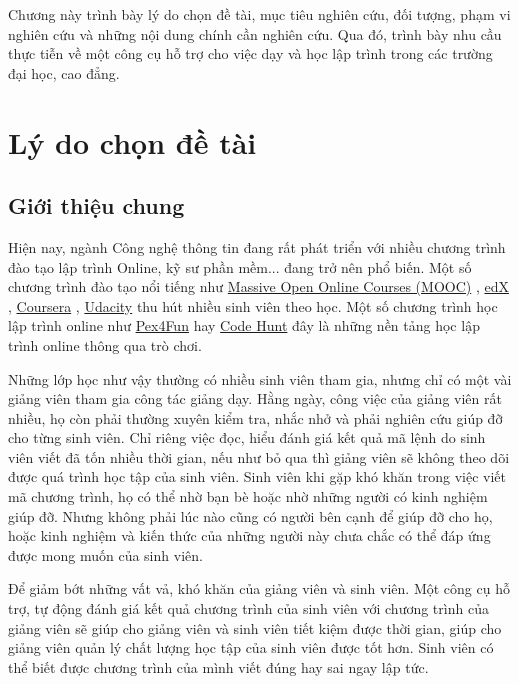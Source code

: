 
Chương này trình bày lý do chọn đề tài, mục tiêu nghiên cứu, đối tượng, phạm vi nghiên cứu và những nội dung chính cần nghiên cứu. Qua đó, trình bày nhu cầu thực tiễn về một công cụ hỗ trợ cho việc dạy và học lập trình trong các trường đại học, cao đẳng.

\section{Lý do chọn đề tài}

\subsection{Giới thiệu chung}

Hiện nay, ngành Công nghệ thông tin đang rất phát triển với nhiều chương trình đào tạo lập trình Online, kỹ sư phần mềm... đang trở nên phổ biến. Một số chương trình đào tạo nổi tiếng như \href{https://www.coursera.org/course/saas}{Massive Open Online Courses (MOOC)} \cite{mooc}, \href{https://www.edx.org/}{edX} \cite{edx}, \href{https://www.coursera.org/}{Coursera} \cite{coursera}, \href{http://www.udacity.com/}{Udacity} \cite{Udacity} thu hút nhiều sinh viên theo học. Một số chương trình học lập trình online như \href{https://www.pexforfun.com/}{Pex4Fun} \cite{Pex4Fun} hay \href{https://www.microsoft.com/en-us/research/project/code-hunt/}{Code Hunt} \cite{CodeHunt} đây là những nền tảng học lập trình online thông qua trò chơi. 

Những lớp học như vậy thường có nhiều sinh viên tham gia, nhưng chỉ có một vài giảng viên tham gia công tác giảng dạy. Hằng ngày, công việc của giảng viên rất nhiều, họ còn phải thường xuyên kiểm tra, nhắc nhở và phải nghiên cứu giúp đỡ cho từng sinh viên. Chỉ riêng việc đọc, hiểu đánh giá kết quả mã lệnh do sinh viên viết đã tốn nhiều thời gian, nếu như bỏ qua thì giảng viên sẽ không theo dõi được quá trình học tập của sinh viên. Sinh viên khi gặp khó khăn trong việc viết mã chương trình, họ có thể nhờ bạn bè hoặc nhờ những người có kinh nghiệm giúp đỡ. Nhưng không phải lúc nào cũng có người bên cạnh để giúp đỡ cho họ, hoặc kinh nghiệm và kiến thức của những người này chưa chắc có thể đáp ứng được mong muốn của sinh viên.

Để giảm bớt những vất vả, khó khăn của giảng viên và sinh viên. Một công cụ hỗ trợ, tự động đánh giá kết quả chương trình của sinh viên với chương trình của giảng viên sẽ giúp cho giảng viên và sinh viên tiết kiệm được thời gian, giúp cho giảng viên quản lý chất lượng học tập của sinh viên được tốt hơn. Sinh viên có thể biết được chương trình của mình viết đúng hay sai ngay lập tức. 

